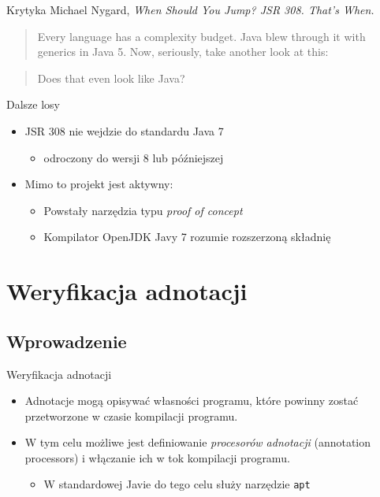 \documentclass{beamer}
\begin{document}
\begin{frame}{Krytyka}
  Michael Nygard, \emph{When Should You Jump? JSR 308. That's When.}
  \pause
  \begin{quote}
Every language has a complexity budget. Java blew through it with
generics in Java 5. Now, seriously, take another look at this:
  \end{quote}
  
  \begin{quote}
    Does that even look like Java? 
  \end{quote}
\end{frame}

\begin{frame}{Dalsze losy}
  \begin{itemize}
  \item<1-> JSR 308 nie wejdzie do standardu Java 7 
    \begin{itemize}
    \item odroczony do wersji 8 lub późniejszej
    \end{itemize}
  \item<2-> Mimo to projekt jest aktywny:
    \begin{itemize}
    \item Powstały narzędzia typu \emph{proof of concept}
    \item Kompilator OpenJDK Javy 7 rozumie rozszerzoną składnię
    \end{itemize}
  \end{itemize}
\end{frame}

\section{Weryfikacja adnotacji}
\subsection{Wprowadzenie}

\begin{frame}{Weryfikacja adnotacji}
\begin{itemize}
\item<1-> Adnotacje mogą opisywać własności programu, które powinny
  zostać przetworzone w czasie kompilacji programu.
\item<2-> W tym celu możliwe jest definiowanie \emph{procesorów
  adnotacji} (annotation processors) i włączanie ich w tok
  kompilacji programu.
  \begin{itemize}
  \item W standardowej Javie do tego celu służy narzędzie \texttt{apt}
  \end{itemize}
\end{itemize}
\end{frame}
\end{document}
